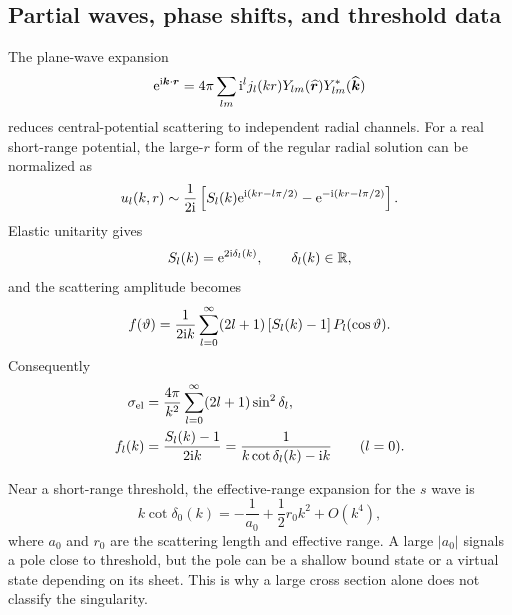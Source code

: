 \subsection{Partial waves, phase shifts, and threshold data}
\label{subsec:partial-waves-phase-shifts}

The plane-wave expansion
\begin{equation}
  \mathrm{e}^{\mathrm{i}\bm k\cdot\bm r}
  =4\pi\sum_{lm}\mathrm{i}^l j_l(kr)
  Y_{lm}(\widehat{\bm r})Y_{lm}^*(\widehat{\bm k})
  \label{eq:rayleigh-expansion}
\end{equation}
reduces central-potential scattering to independent radial channels.  For a
real short-range potential, the large-$r$ form of the regular radial solution
can be normalized as
\begin{equation}
  u_l(k,r)\sim
  \frac{1}{2\mathrm{i}}
  \left[S_l(k)\mathrm{e}^{\mathrm{i}(kr-l\pi/2)}
  -\mathrm{e}^{-\mathrm{i}(kr-l\pi/2)}\right] .
  \label{eq:partial-wave-asymptotic}
\end{equation}
Elastic unitarity gives
\begin{equation}
  S_l(k)=\mathrm{e}^{2\mathrm{i}\delta_l(k)},
  \qquad \delta_l(k)\in\mathbb{R},
  \label{eq:S-phase-shift}
\end{equation}
and the scattering amplitude becomes
\begin{equation}
  f(\vartheta)
  =\frac{1}{2\mathrm{i} k}\sum_{l=0}^{\infty}(2l+1)
  \left[S_l(k)-1\right]P_l(\cos\vartheta) .
  \label{eq:partial-wave-amplitude}
\end{equation}
Consequently
\begin{align}
  \sigma_{\mathrm{el}}
  &=\frac{4\pi}{k^2}\sum_{l=0}^{\infty}(2l+1)
  \sin^2\delta_l,
  \label{eq:partial-wave-cross-section}\\
  f_l(k)&=\frac{S_l(k)-1}{2\mathrm{i} k}
  =\frac{1}{k\cot\delta_l(k)-\mathrm{i} k}
  \qquad (l=0) .
  \label{eq:s-wave-amplitude}
\end{align}

Near a short-range threshold, the effective-range expansion for the $s$ wave
is
\begin{equation}
  k\cot\delta_0(k)
  =-\frac{1}{a_0}+\frac{1}{2}r_0k^2+O(k^4),
  \label{eq:effective-range-expansion}
\end{equation}
where $a_0$ and $r_0$ are the scattering length and effective range.  A large
$\lvert a_0\rvert$ signals a pole close to threshold, but the pole can be a
shallow bound state or a virtual state depending on its sheet.  This is why a
large cross section alone does not classify the singularity.

